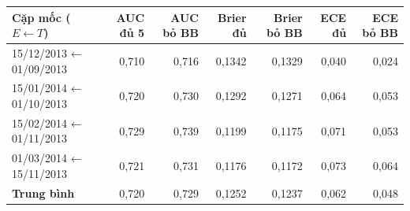 \begin{tabular}{lrrrrrr}
\toprule
Cặp mốc ($E \leftarrow T$) & AUC đủ 5 & AUC bỏ BB & Brier đủ & Brier bỏ BB & ECE đủ & ECE bỏ BB \\
\midrule
15/12/2013 ← 01/09/2013 & 0,710 & 0,716 & 0,1342 & 0,1329 & 0,040 & 0,024 \\
15/01/2014 ← 01/10/2013 & 0,720 & 0,730 & 0,1292 & 0,1271 & 0,064 & 0,053 \\
15/02/2014 ← 01/11/2013 & 0,729 & 0,739 & 0,1199 & 0,1175 & 0,071 & 0,053 \\
01/03/2014 ← 15/11/2013 & 0,721 & 0,731 & 0,1176 & 0,1172 & 0,073 & 0,064 \\
\textbf{Trung bình} & 0,720 & 0,729 & 0,1252 & 0,1237 & 0,062 & 0,048 \\
\bottomrule
\end{tabular}
